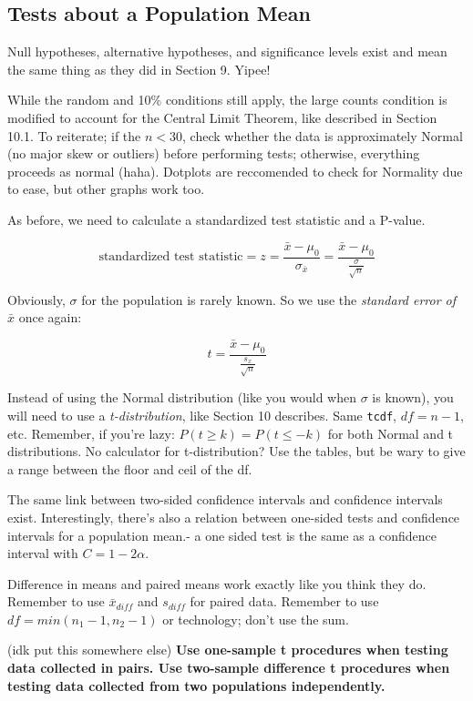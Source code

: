 \documentclass[12pt, a4paper]{article}
\theoremstyle{definition}
\begin{document}
\subsection{Tests about a Population Mean}
Null hypotheses, alternative hypotheses, and significance levels exist and mean the same thing as they did in Section 9. Yipee!

While the random and 10\% conditions still apply, the large counts condition is modified to account for the Central Limit Theorem, like described in Section 10.1.
To reiterate; if the $n < 30$, check whether the data is approximately Normal (no major skew or outliers) before performing tests; otherwise, everything proceeds as normal (haha).
Dotplots are reccomended to check for Normality due to ease, but other graphs work too.

As before, we need to calculate a standardized test statistic and a P-value.

\[\textrm{standardized test statistic} = z = \frac{\bar{x} - \mu_0}{\sigma_{\bar{x}}} = \frac{\bar{x} - \mu_0}{\frac{\sigma}{\sqrt{n}}}\]

Obviously, $\sigma$ for the population is rarely known. So we use the \textit{standard error of $\bar{x}$} once again:

\[t = \frac{\bar{x} - \mu_0}{\frac{s_x}{\sqrt{n}}}\]

Instead of using the Normal distribution (like you would when $\sigma$ is known), you will need to use a \textit{t-distribution}, like Section 10 describes.
Same \verb|tcdf|, $df = n - 1$, etc.
Remember, if you're lazy: $P(t \geq k) = P(t \leq -k)$ for both Normal and t distributions. No calculator for t-distribution? Use the tables, but be wary to give a range between the floor and ceil of the df.

The same link between two-sided confidence intervals and confidence intervals exist.
Interestingly, there's also a relation between one-sided tests and confidence intervals for a population mean.- a one sided test is the same as a confidence interval with $C = 1 - 2\alpha$.

Difference in means and paired means work exactly like you think they do.
Remember to use $\bar{x}_{diff}$ and $s_{diff}$ for paired data.
Remember to use $df = min(n_1 - 1, n_2 - 1)$ or technology; don't use the sum.

(idk put this somewhere else) \textbf{Use one-sample t procedures when testing data collected in pairs. Use two-sample difference t procedures when testing data collected from two populations independently.}
\newpage
\end{document}

